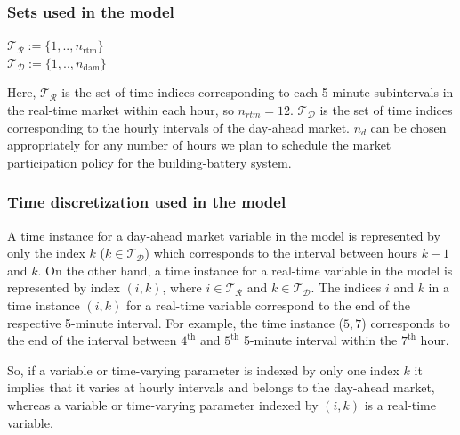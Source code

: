\documentclass[11pt,twoside]{article}
\begin{document}
\subsubsection{Sets used in the model}
\begin{center}
$\mathcal{T_R} := \{1,..,n_{\textrm{rtm}}\}$\\$ \mathcal{T_D} :=  \{1,..,n_{\textrm{dam}}\}$
\end{center}
Here, $\mathcal{T_R}$ is the set of time indices corresponding to each 5-minute subintervals in the real-time market within each hour, so $n_{rtm}=12$. $\mathcal{T_D}$ is the set of time indices corresponding to the hourly intervals of the day-ahead market. $n_d$ can be chosen appropriately for any number of hours we plan to schedule the market participation policy for the building-battery system.
\subsubsection{Time discretization used in the model}
A time instance for a day-ahead market variable in the model is represented by only the index $k$ ($k \in \mathcal{T_D}$) which corresponds to the interval between hours $k-1$ and $k$. On the other hand, a time instance for a real-time variable in the model is represented by index $(i,k)$, where $i \in \mathcal{T_R}$ and $ k \in \mathcal{T_D}$. The indices $i$ and $k$ in a time instance $(i,k)$ for a real-time variable correspond to the end of the respective 5-minute interval. For example, the time instance ($5,7$) corresponds to the end of the interval between $4^{\text{th}}$ and $5^{\text{th}}$ 5-minute interval within the $7^\textrm{th}$ hour. 

So, if a variable or time-varying parameter is indexed by only one index $k$ it implies that it varies at hourly intervals and belongs to the day-ahead market, whereas a variable or time-varying parameter indexed by $(i,k)$ is a real-time variable. 
\end{document}
